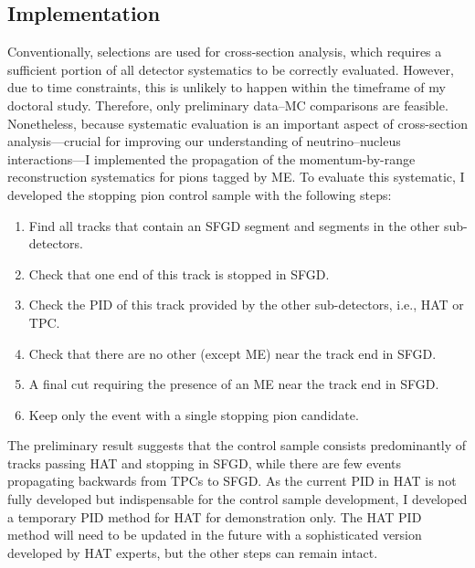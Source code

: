           \subsection{Implementation}
          \label{sec:sppi-imp}
          Conventionally, selections are used for cross-section analysis, which requires a sufficient portion of all detector systematics to be correctly evaluated.
          However, due to time constraints, this is unlikely to happen within the timeframe of my doctoral study.
          Therefore, only preliminary data–MC comparisons are feasible.
          Nonetheless, because systematic evaluation is an important aspect of cross-section analysis—crucial for improving our understanding of neutrino–nucleus interactions—I implemented the propagation of the momentum-by-range reconstruction systematics for pions tagged by ME.
          To evaluate this systematic, I developed the stopping pion control sample with the following steps:
          \begin{enumerate}
          \item Find all tracks that contain an SFGD segment and segments in the other sub-detectors.
          \item Check that one end of this track is stopped in SFGD.
          \item Check the PID of this track provided by the other sub-detectors, i.e., HAT or TPC.
          \item Check that there are no other (except ME) near the track end in SFGD.
          \item A final cut requiring the presence of an ME near the track end in SFGD.
          \item Keep only the event with a single stopping pion candidate.
          \end{enumerate}
          The preliminary result suggests that the control sample consists predominantly of tracks passing HAT and stopping in SFGD, while there are few events propagating backwards from TPCs to SFGD.
          As the current PID in HAT is not fully developed but indispensable for the control sample development, I developed a temporary PID method for HAT for demonstration only. 
          The HAT PID method will need to be updated in the future with a sophisticated version developed by HAT experts, but the other steps can remain intact.

